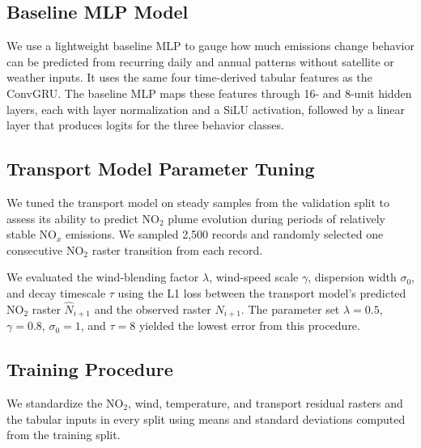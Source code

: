 \documentclass[sigconf,nonacm]{acmart}
\newcommand{\NOx}{NO$_x$}
\begin{document}
\subsection{Baseline MLP Model}

We use a lightweight baseline MLP to gauge how much emissions change behavior
can be predicted from recurring daily and annual patterns without satellite or
weather inputs. It uses the same four time-derived tabular features as the
ConvGRU. The baseline MLP maps these features through 16- and 8-unit hidden
layers, each with layer normalization and a SiLU activation,
followed by a linear layer that produces logits for the three behavior classes.

\subsection{Transport Model Parameter Tuning}
\label{sec:transport-parameter-tuning}

We tuned the transport model on steady samples from the validation split to assess its ability to
predict NO$_2$ plume evolution during periods of relatively stable
\NOx{} emissions. We sampled 2,500 records and randomly selected one consecutive NO$_2$ raster transition
from each record.

We evaluated the wind-blending factor $\lambda$, wind-speed scale $\gamma$,
dispersion width $\sigma_0$, and decay timescale $\tau$ using
the L1 loss between the transport model's predicted NO$_2$ raster
$\widehat{N}_{i+1}$ and the observed raster $N_{i+1}$. The parameter set $\lambda=0.5$, $\gamma=0.8$,
$\sigma_0=1$, and $\tau=8$ yielded the lowest error from this procedure.

\subsection{Training Procedure}

We standardize the NO$_2$, wind, temperature, and
transport residual rasters and the tabular inputs in every split using means
and standard deviations computed from the training split.
\end{document}
